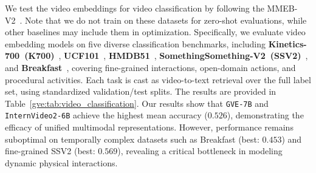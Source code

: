 We test the video embeddings for video classification by following the MMEB-V2~\cite{meng2025vlm2vec}.
Note that we do not train on these datasets for zero-shot evaluations, while other baselines may include them in optimization.
Specifically, we evaluate video embedding models on five diverse classification benchmarks, including \textbf{Kinetics-700~(K700)}~\cite{carreira2019short}, \textbf{UCF101}~\cite{soomro2012ucf101}, \textbf{HMDB51}~\cite{kuehne2011hmdb}, \textbf{SomethingSomething-V2~(SSV2)}~\cite{goyal2017something}, and \textbf{Breakfast}~\cite{kuehne2014language}, covering fine-grained interactions, open-domain actions, and procedural activities. Each task is cast as video-to-text retrieval over the full label set, using standardized validation/test splits.
The results are provided in Table~\ref{gve:tab:video_classification}.
Our results show that \texttt{GVE-7B} and \texttt{InternVideo2-6B} achieve the highest mean accuracy ($0.526$), demonstrating the efficacy of unified multimodal representations. However, performance remains suboptimal on temporally complex datasets such as Breakfast (best: $0.453$) and fine-grained SSV2 (best: $0.569$), revealing a critical bottleneck in modeling dynamic physical interactions.
\fi
